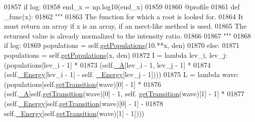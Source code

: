 \begin{DoxyCode}
01857                 \textcolor{keywordflow}{if} log:
01858                     end\_x = np.log10(end\_x)
01859             
01860             @profile
01861             \textcolor{keyword}{def }\_func(x):
01862                 \textcolor{stringliteral}{"""}
01863 \textcolor{stringliteral}{                The function for which a root is looked for.}
01864 \textcolor{stringliteral}{                It must return an array if x is an array, if an nsect-like method is used.}
01865 \textcolor{stringliteral}{                The returned value is already normalized to the intensity ratio.}
01866 \textcolor{stringliteral}{}
01867 \textcolor{stringliteral}{                """}
01868                 \textcolor{keywordflow}{if} log:
01869                     populations = self.\hyperlink{classpyneb_1_1core_1_1pynebcore_1_1_atom_aab7496403c8aaef40ab3b20b5c00e9f0}{getPopulations}(10.**x, den)
01870                 \textcolor{keywordflow}{else}:
01871                     populations = self.\hyperlink{classpyneb_1_1core_1_1pynebcore_1_1_atom_aab7496403c8aaef40ab3b20b5c00e9f0}{getPopulations}(x, den)
01872                 I = \textcolor{keyword}{lambda} lev\_i, lev\_j: (populations[lev\_i - 1] * 
01873                                           (self.\hyperlink{classpyneb_1_1core_1_1pynebcore_1_1_atom_aa6416fe661b8deaa008179314727e025}{\_A}[lev\_i - 1, lev\_j - 1] * 
01874                                            (self.\hyperlink{classpyneb_1_1core_1_1pynebcore_1_1_atom_a52e68715246d258bf0a14f4bd06e89e4}{\_Energy}[lev\_i - 1] - self.
      \hyperlink{classpyneb_1_1core_1_1pynebcore_1_1_atom_a52e68715246d258bf0a14f4bd06e89e4}{\_Energy}[lev\_j - 1])))
01875                 L = \textcolor{keyword}{lambda} wave: (populations[self.\hyperlink{classpyneb_1_1core_1_1pynebcore_1_1_atom_a7c9f17a3d9e841267add92377d9d1ede}{getTransition}(wave)[0] - 1] * 
01876                                   (self.\hyperlink{classpyneb_1_1core_1_1pynebcore_1_1_atom_aa6416fe661b8deaa008179314727e025}{\_A}[self.\hyperlink{classpyneb_1_1core_1_1pynebcore_1_1_atom_a7c9f17a3d9e841267add92377d9d1ede}{getTransition}(wave)[0] - 1, self.
      \hyperlink{classpyneb_1_1core_1_1pynebcore_1_1_atom_a7c9f17a3d9e841267add92377d9d1ede}{getTransition}(wave)[1] - 1] * 
01877                                    (self.\hyperlink{classpyneb_1_1core_1_1pynebcore_1_1_atom_a52e68715246d258bf0a14f4bd06e89e4}{\_Energy}[self.\hyperlink{classpyneb_1_1core_1_1pynebcore_1_1_atom_a7c9f17a3d9e841267add92377d9d1ede}{getTransition}(wave)[0] - 1] - 
01878                                     self.\hyperlink{classpyneb_1_1core_1_1pynebcore_1_1_atom_a52e68715246d258bf0a14f4bd06e89e4}{\_Energy}[self.\hyperlink{classpyneb_1_1core_1_1pynebcore_1_1_atom_a7c9f17a3d9e841267add92377d9d1ede}{getTransition}(wave)[1] - 1])))

\end{DoxyCode}
